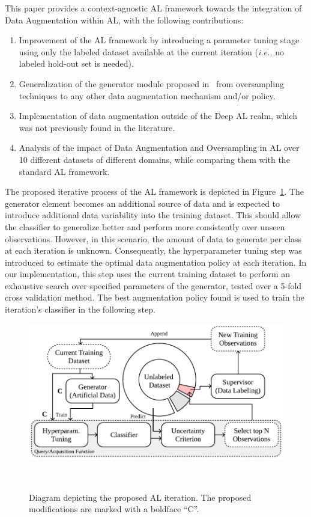 \documentclass[preprint, 12pt]{elsarticle}
\begin{document}
This paper provides a context-agnostic AL framework towards the integration of
Data Augmentation within AL, with the following contributions:

\begin{enumerate}
    \item Improvement of the AL framework by introducing a parameter
        tuning stage using only the labeled dataset available at the current
        iteration (\textit{i.e.,} no labeled hold-out set is needed).
    \item Generalization of the generator module proposed
        in~\cite{Fonseca2021} from oversampling techniques to any other data
        augmentation mechanism and/or policy.
    \item Implementation of data augmentation outside of the Deep AL realm,
        which was not previously found in the literature.
    \item Analysis of the impact of Data Augmentation and Oversampling
        in AL over 10 different datasets of different domains, while
        comparing them with the standard AL framework.
\end{enumerate}

The proposed iterative process of the AL framework is depicted in
Figure~\ref{fig:al_proposed}. The generator element becomes an additional
source of data and is expected to introduce additional data variability into
the training dataset. This should allow the classifier to generalize better
and perform more consistently over unseen observations. However, in this
scenario, the amount of data to generate per class at each iteration is
unknown. Consequently, the hyperparameter tuning step was introduced to
estimate the optimal data augmentation policy at each iteration. In our
implementation, this step uses the current training dataset to perform an
exhaustive search over specified parameters of the generator, tested over a
5-fold cross validation method. The best augmentation policy found is used
to train the iteration's classifier in the following step.

\begin{figure}[H]
	\centering
	\includegraphics[width=.75\linewidth]{../analysis/al_proposed}
    \caption{%
        Diagram depicting the proposed AL iteration. The proposed
        modifications are marked with a boldface ``C''.
    }~\label{fig:al_proposed}
\end{figure}
\end{document}
